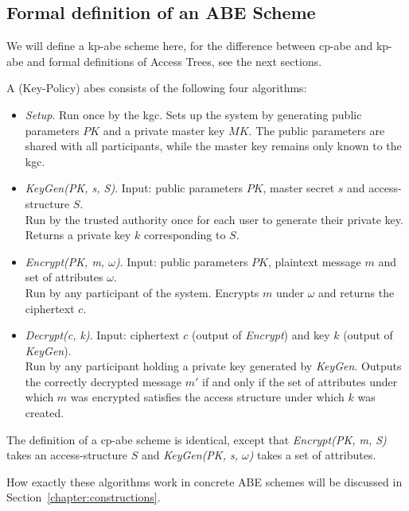 \subsection{Formal definition of an ABE Scheme}\label{sec:definition-es}

We will define a \acrshort{kp-abe} scheme here, for the difference between \acrshort{cp-abe} and \acrshort{kp-abe} and formal definitions of Access Trees, see the next sections.

\begin{definition}
    A (Key-Policy) \Acrlong{abes} consists of the following four algorithms:~\cite{goyal_attribute-based_2006}
    \begin{itemize}
        \item \emph{Setup}. Run once by the \acrfull{kgc}. Sets up the system by generating public parameters $PK$ and a private master key $MK$. The public parameters are shared with all participants, while the master key remains only known to the \acrshort{kgc}.
        \item \emph{KeyGen(PK, s, S)}. Input: public parameters $PK$, master secret $s$ and \gls{access-structure} $S$.\\
        Run by the trusted authority once for each user to generate their private key. Returns a private key $k$ corresponding to $S$.
        \item \emph{Encrypt(PK, m, $\omega$)}. Input: public parameters $PK$, plaintext message $m$ and set of attributes $\omega$.\\
        Run by any participant of the system. Encrypts $m$ under $\omega$ and returns the ciphertext $c$.
        \item \emph{Decrypt(c, k)}. Input: ciphertext $c$ (output of \emph{Encrypt}) and key $k$ (output of \emph{KeyGen}).\\
        Run by any participant holding a private key generated by \emph{KeyGen}. Outputs the correctly decrypted message $m'$ if and only if the set of attributes under which $m$ was encrypted satisfies the access structure under which $k$ was created.
    \end{itemize}
\end{definition}

The definition of a \acrshort{cp-abe} scheme is identical, except that \emph{Encrypt(PK, m, S)} takes an \gls{access-structure} $S$ and \emph{KeyGen(PK, s, $\omega$)} takes a set of attributes.

How exactly these algorithms work in concrete ABE schemes will be discussed in Section~\ref{chapter:constructions}.

